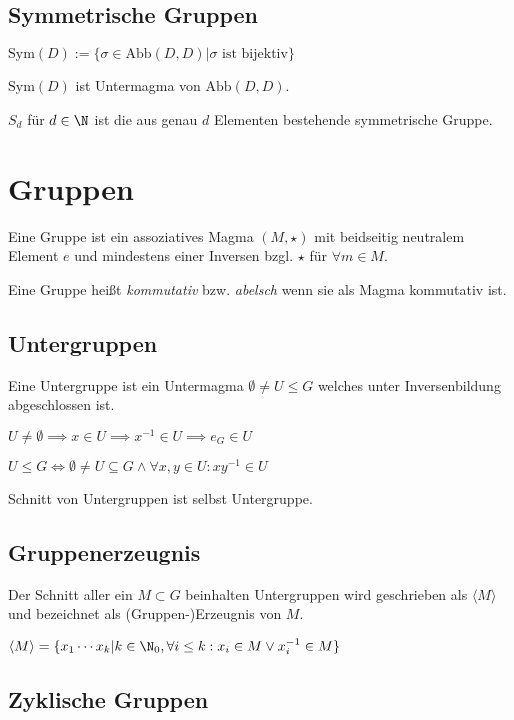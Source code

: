 \subsection*{Symmetrische Gruppen}

$\text{Sym}(D) := \{ \sigma \in \text{Abb}(D,D) | \sigma \text{ ist bijektiv}\}$

$\text{Sym}(D)$ ist Untermagma von $\text{Abb}(D,D)$.

$S_d$ für $d \in \N$ ist die aus genau $d$ Elementen bestehende symmetrische Gruppe.

\section*{Gruppen}

Eine Gruppe ist ein assoziatives Magma $(M, \star)$ mit beidseitig neutralem Element $e$ und mindestens einer Inversen bzgl. $\star$ für $\forall m \in M$.

Eine Gruppe heißt \emph{kommutativ} bzw. \emph{abelsch} wenn sie als Magma kommutativ ist.

\subsection*{Untergruppen}

Eine Untergruppe ist ein Untermagma $\emptyset \neq U \leq G$ welches unter Inversenbildung abgeschlossen ist.

$U \neq \emptyset \implies x \in U \implies x^{-1} \in U \implies e_G \in U$

$U \leq G \iff \emptyset \neq U \subseteq G \land \forall x, y \in U : xy^{-1} \in U$

Schnitt von Untergruppen ist selbst Untergruppe.

\subsection*{Gruppenerzeugnis}

Der Schnitt aller ein $M \subset G$ beinhalten Untergruppen wird geschrieben als $\langle M \rangle$ und bezeichnet als (Gruppen-)Erzeugnis von $M$.

$\langle M \rangle = \{ x_1 \cdots x_k | k \in \N_0, \forall i \leq k : x_i \in M \lor x_i^{-1} \in M \}$

\subsection*{Zyklische Gruppen}

